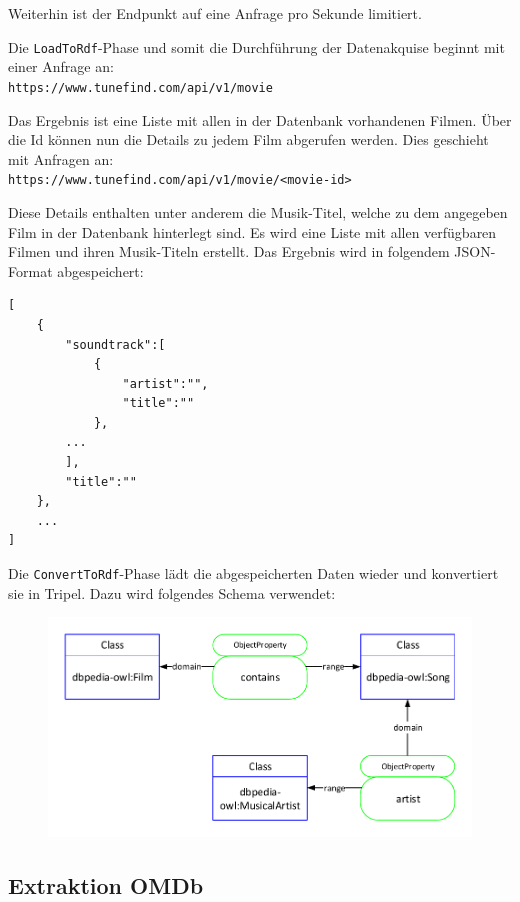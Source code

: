 \documentclass[parskip]{scrartcl}
\begin{document}
Weiterhin ist der Endpunkt auf eine Anfrage pro Sekunde limitiert.

Die \texttt{LoadToRdf}-Phase und somit die Durchführung der Datenakquise beginnt mit einer Anfrage an:\\
\texttt{https://www.tunefind.com/api/v1/movie}

Das Ergebnis ist eine Liste mit allen in der Datenbank vorhandenen Filmen. Über die Id können nun die Details zu jedem Film abgerufen werden. Dies geschieht mit Anfragen an:\\
\texttt{https://www.tunefind.com/api/v1/movie/<movie-id>}

Diese Details enthalten unter anderem die Musik-Titel, welche zu dem angegeben Film in der Datenbank hinterlegt sind.
Es wird eine Liste mit allen verfügbaren Filmen und ihren Musik-Titeln erstellt. Das Ergebnis wird in folgendem JSON-Format abgespeichert:

\begin{lstlisting}[caption={Tunefind JSON-Format}, label={list:tunefindJson}]
[  
    {  
        "soundtrack":[  
            {
                "artist":"",
                "title":""
            },
        ...
        ],
        "title":""
    },
    ...
]
\end{lstlisting}

Die \texttt{ConvertToRdf}-Phase lädt die abgespeicherten Daten wieder und konvertiert sie in Tripel. Dazu wird folgendes Schema verwendet:

\begin{figure}[htbp]
    \centering
    \includegraphics[scale=0.8]{tunefind}
\end{figure}

\subsection{Extraktion OMDb}
\end{document}
